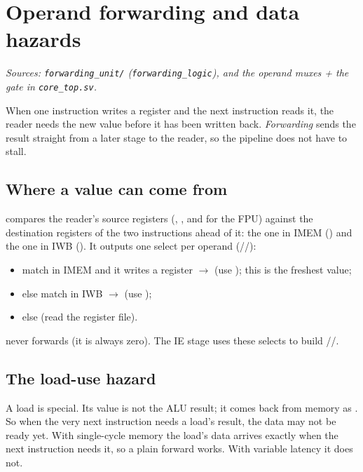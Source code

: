 \section{Operand forwarding and data hazards}
\textit{Sources: \texttt{forwarding\_unit/} (\texttt{forwarding\_logic}), and the
operand muxes + the  gate in \texttt{core\_top.sv}.}

When one instruction writes a register and the next instruction reads it, the
reader needs the new value before it has been written back. \emph{Forwarding}
sends the result straight from a later stage to the reader, so the pipeline does
not have to stall.

\subsection{Where a value can come from}
 compares the reader's source registers (,
, and  for the FPU) against the destination registers of the
two instructions ahead of it: the one in IMEM () and the one in
IWB (). It outputs one select per operand
(//):
\begin{itemize}[leftmargin=1.4em,itemsep=1pt]
\item match in IMEM and it writes a register $\rightarrow$ 
  (use ); this is the freshest value;
\item else match in IWB $\rightarrow$  (use );
\item else  (read the register file).
\end{itemize}
 never forwards (it is always zero). The IE stage uses these selects to
build //.

\subsection{The load-use hazard}
A load is special. Its value is not the ALU result; it comes back from memory as
. So when the very next instruction needs a load's result,
the data may not be ready yet. With single-cycle memory the load's data arrives
exactly when the next instruction needs it, so a plain forward works. With
variable latency it does not.

